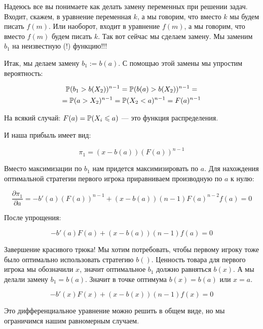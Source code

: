 \begin{enumerate}
Надеюсь все вы понимаете как делать замену переменных при решении задач. Входит, скажем, в уравнение переменная $ k $, а мы говорим, что вместо $ k $ мы будем писать $ f(m) $. Или наоборот, входит в уравнение $ f(m) $, а мы говорим, что вместо $ f(m) $ будем писать $ k $. Так вот сейчас мы сделаем замену. Мы заменим $ b_{1} $ на неизвестную (!) функцию!!! 

Итак, мы делаем замену $ b_{1}:=b(a) $. С помощью этой замены мы упростим вероятность:

\begin{multline}
\P(b_{1}>b(X_{2}))^{n-1}=\P(b(a)>b(X_{2}))^{n-1}=\\
=\P(a>X_{2})^{n-1}=\P(X_{2}<a)^{n-1}=F(a)^{n-1}
\end{multline}

На всякий случай: $ F(a)=\P(X_{i}\leq a) $ --- это функция распределения.

И наша прибыль имеет вид:

\begin{equation}
\pi_{1}=(x-b(a))(F(a))^{n-1}
\end{equation}


Вместо максимизации по $ b_{1} $ нам придется максимизировать по $ a $. Для нахождения оптимальной стратегии первого игрока приравниваем производную по $ a $ к нулю:

\begin{equation}
\frac{\partial \pi_{1}}{\partial a}=-b'(a)(F(a))^{n-1}+(x-b(a))(n-1)F(a)^{n-2}f(a)=0
\end{equation}


После упрощения:

\begin{equation}
-b'(a)F(a)+(x-b(a))(n-1)f(a)=0
\end{equation}


Завершение красивого трюка! Мы хотим потребовать, чтобы первому игроку тоже было оптимально использовать стратегию $ b() $. Ценность товара для первого игрока мы обозначили $ x $, значит оптимальное $ b_{1} $ должно равняться $ b(x) $. А мы делали замену $ b_{1}=b(a) $. Значит в точке оптимума $ b(x)=b(a) $ или $ x=a $. 

\begin{equation}
\label{first_price_final_diffeq}
-b'(x)F(x)+(x-b(x))(n-1)f(x)=0
\end{equation}


Это дифференциальное уравнение можно решить в общем виде, но мы ограничимся нашим равномерным случаем.


\end{enumerate}
